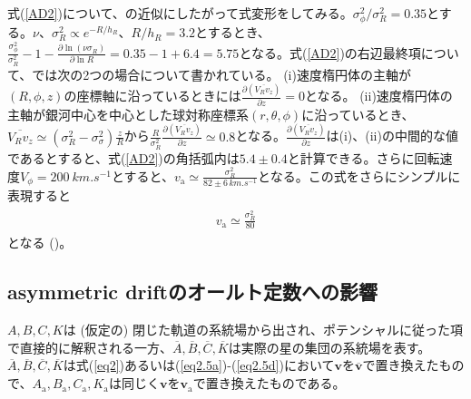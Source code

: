 式(\ref{AD2})について、\cite{BT2008}の近似にしたがって式変形をしてみる。$\sigma_{\phi}^2/\sigma_R^2 = 0.35$とする。$\nu、\sigma_R^2 \propto e^{-R/h_R}、R/h_R = 3.2$とするとき、
$\frac{\sigma_{\phi}^2}{\sigma_R^2} - 1 - \frac{\partial \ln{(\nu \sigma_R)}}{\partial \ln{R}} = 0.35 - 1 + 6.4 = 5.75$となる。式(\ref{AD2})の右辺最終項について、\cite{BT2008}では次の2つの場合について書かれている。
(i)速度楕円体の主軸が$(R,\phi,z)$の座標軸に沿っているときには$\frac{\partial(\overline{V_R v_z})}{\partial z} = 0$となる。
(ii)速度楕円体の主軸が銀河中心を中心とした球対称座標系$(r,\theta,\phi)$に沿っているとき、$\overline{V_R v_z} \simeq (\sigma_R^2 - \sigma_{\sigma}^2)\frac{z}{R}$から$\frac{R}{\sigma_R^2} \frac{\partial (\overline{V_R v_z})}{\partial z} \simeq 0.8$となる。$\frac{\partial(\overline{V_R v_z})}{\partial z}$は(i)、(ii)の中間的な値であるとすると、式(\ref{AD2})の角括弧内は$5.4 \pm 0.4$と計算できる。さらに回転速度$V_{\phi} = \SI{200}{km.s^{-1}}$とすると、$v_{\mathrm{a}} \simeq \frac{\sigma_R^2}{82 \pm 6\,\si{km.s^{-1}}}$となる。この式をさらにシンプルに表現すると
\begin{align}
\begin{aligned}
    v_{\mathrm{a}} \simeq \frac{\sigma_R^2}{80}
\end{aligned} \label{AD3}
\end{align}
となる (\cite{BT2008})。




\subsection{asymmetric driftのオールト定数への影響}
$A,B,C,K$は (仮定の) 閉じた軌道の系統場から出され、ポテンシャルに従った項で直接的に解釈される一方、$\overline{A},\overline{B},\overline{C},\overline{K}$は実際の星の集団の系統場を表す。$\overline{A},\overline{B},\overline{C},\overline{K}$は式(\ref{eq2})あるいは(\ref{eq2.5a})-(\ref{eq2.5d})において$\pmb{v}$を$\pmb{\overline{v}}$で置き換えたもので、$A_{\mathrm{a}},B_{\mathrm{a}},C_{\mathrm{a}},K_{\mathrm{a}}$は同じく$\pmb{v}$を$\pmb{v}_{\mathrm{a}}$で置き換えたものである。

